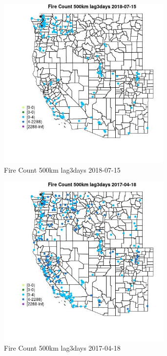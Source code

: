 \begin{figure} 
\centering  
\includegraphics[width=0.77\textwidth]{Code_Outputs/Report_ML_input_PM25_Step4_part_e_de_duplicated_aves_compiled_2019-05-20wNAs_MapObsFire_Count_500km_lag3days2018-07-15.jpg} 
\caption{\label{fig:Report_ML_input_PM25_Step4_part_e_de_duplicated_aves_compiled_2019-05-20wNAsMapObsFire_Count_500km_lag3days2018-07-15}Fire Count 500km lag3days 2018-07-15} 
\end{figure} 
 

\begin{figure} 
\centering  
\includegraphics[width=0.77\textwidth]{Code_Outputs/Report_ML_input_PM25_Step4_part_e_de_duplicated_aves_compiled_2019-05-20wNAs_MapObsFire_Count_500km_lag3days2017-04-18.jpg} 
\caption{\label{fig:Report_ML_input_PM25_Step4_part_e_de_duplicated_aves_compiled_2019-05-20wNAsMapObsFire_Count_500km_lag3days2017-04-18}Fire Count 500km lag3days 2017-04-18} 
\end{figure} 
 

